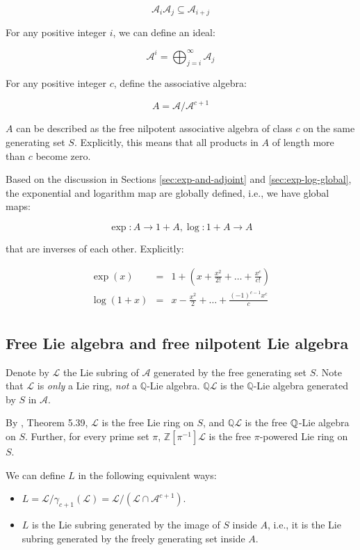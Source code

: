 $$\mathcal{A}_i\mathcal{A}_j \subseteq \mathcal{A}_{i+j}$$

For any positive integer $i$, we can define an ideal:

$$\mathcal{A}^i = \bigoplus_{j=i}^\infty \mathcal{A}_j$$

For any positive integer $c$, define the associative algebra:

$$A = \mathcal{A}/\mathcal{A}^{c+1}$$

$A$ can be described as the free nilpotent associative algebra of
class $c$ on the same generating set $S$. Explicitly, this means that
all products in $A$ of length more than $c$ become zero.

Based on the discussion in Sections \ref{sec:exp-and-adjoint}
and \ref{sec:exp-log-global}, the exponential and logarithm map are
globally defined, i.e., we have global maps:

$$\exp:A \to 1 + A, \log: 1 + A \to A$$

that are inverses of each other. Explicitly:

\begin{eqnarray*}
  \exp(x) & = & 1 + \left(x + \frac{x^2}{2!} + \dots + \frac{x^c}{c!}\right)\\
  \log(1 + x) & = & x - \frac{x^2}{2} + \dots + \frac{(-1)^{c-1}x^c}{c}\\
\end{eqnarray*}


\subsection{Free Lie algebra and free nilpotent Lie algebra}

Denote by $\mathcal{L}$ the Lie subring of $\mathcal{A}$ generated by
the free generating set $S$. Note that $\mathcal{L}$ is {\em only} a
Lie ring, {\em not} a $\mathbb{Q}$-Lie
algebra. $\mathbb{Q}\mathcal{L}$ is the $\mathbb{Q}$-Lie algebra
generated by $S$ in $\mathcal{A}$.

By \cite{Khukhro}, Theorem 5.39, $\mathcal{L}$ is the free Lie ring on
$S$, and $\mathbb{Q}\mathcal{L}$ is the free $\mathbb{Q}$-Lie algebra on
$S$. Further, for every prime set $\pi$,
$\mathbb{Z}[\pi^{-1}]\mathcal{L}$ is the free $\pi$-powered Lie ring
on $S$.

We can define $L$ in the following equivalent ways:

\begin{itemize}
\item $L = \mathcal{L}/\gamma_{c+1}(\mathcal{L}) =
  \mathcal{L}/(\mathcal{L} \cap \mathcal{A}^{c+1})$.
\item $L$ is the Lie subring generated by the image of $S$ inside $A$,
  i.e., it is the Lie subring generated by the freely generating set
  inside $A$.
\end{itemize}

